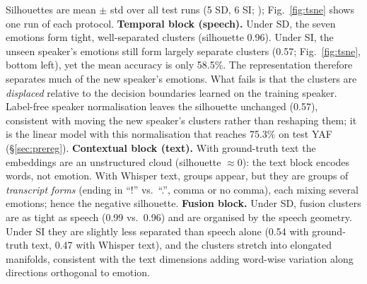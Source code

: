 Silhouettes are mean $\pm$ std over all test runs (5 SD, 6 SI; ); Fig.~\ref{fig:tsne} shows one run of each protocol.
\textbf{Temporal block (speech).} Under SD, the seven emotions form tight, well-separated clusters (silhouette 0.96).
Under SI, the unseen speaker's emotions still form largely separate clusters (0.57; Fig.~\ref{fig:tsne}, bottom left), yet the mean accuracy is only 58.5\%.
The representation therefore separates much of the new speaker's emotions. What fails is that the clusters are \emph{displaced} relative to the decision boundaries learned on the training speaker.
Label-free speaker normalisation leaves the silhouette unchanged (0.57), consistent with moving the new speaker's clusters rather than reshaping them; it is the linear model with this normalisation that reaches 75.3\% on test YAF (\S\ref{sec:prereg}).
\textbf{Contextual block (text).} With ground-truth text the embeddings are an unstructured cloud (silhouette $\approx$0): the text block encodes words, not emotion.
With Whisper text, groups appear, but they are groups of \emph{transcript forms} (ending in ``!'' vs.\ ``.'', comma or no comma), each mixing several emotions; hence the negative silhouette.
\textbf{Fusion block.} Under SD, fusion clusters are as tight as speech (0.99 vs.\ 0.96) and are organised by the speech geometry.
Under SI they are slightly less separated than speech alone (0.54 with ground-truth text, 0.47 with Whisper text), and the clusters stretch into elongated manifolds, consistent with the text dimensions adding word-wise variation along directions orthogonal to emotion.

